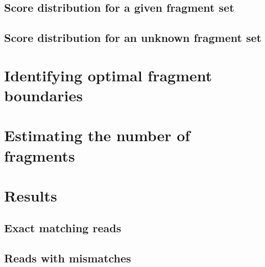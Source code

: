 


\subsection{Score distribution for a given fragment set}


\subsection{Score distribution for an unknown fragment set}


\section{Identifying optimal fragment boundaries}



\section{Estimating the number of fragments}




\section{Results}


\subsection{Exact matching reads}

\subsection{Reads with mismatches}
